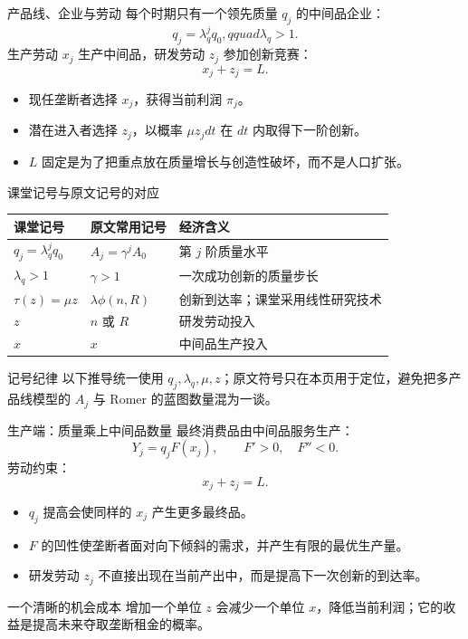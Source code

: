 \documentclass[aspectratio=32]{beamer}
\begin{document}
\begin{frame}{产品线、企业与劳动}
\small
每个时期只有一个领先质量 $q_j$ 的中间品企业：
\[
  q_j=\lambda_q^j q_0,qquad \lambda_q>1.
\]
生产劳动 $x_j$ 生产中间品，研发劳动 $z_j$ 参加创新竞赛：
\[
  \boxed{x_j+z_j=L}.
\]
\begin{itemize}
  \item 现任垄断者选择 $x_j$，获得当前利润 $\pi_j$。
  \item 潜在进入者选择 $z_j$，以概率 $\mu z_jdt$ 在 $dt$ 内取得下一阶创新。
  \item $L$ 固定是为了把重点放在质量增长与创造性破坏，而不是人口扩张。
\end{itemize}
\end{frame}

\begin{frame}{课堂记号与原文记号的对应}
\scriptsize
\begin{table}
\centering
\begin{tabular}{p{}p{}p{}}
\toprule
课堂记号 & 原文常用记号 & 经济含义 \\
\midrule
$q_j=\lambda_q^j q_0$ & $A_j=\gamma^jA_0$ & 第 $j$ 阶质量水平 \\
$\lambda_q>1$ & $\gamma>1$ & 一次成功创新的质量步长 \\
$\tau(z)=\mu z$ & $\lambda\phi(n,R)$ & 创新到达率；课堂采用线性研究技术 \\
$z$ & $n$ 或 $R$ & 研发劳动投入 \\
$x$ & $x$ & 中间品生产投入 \\
\bottomrule
\end{tabular}
\end{table}
\vspace{0.15cm}
\begin{alertblock}{记号纪律}
以下推导统一使用 $q_j,\lambda_q,\mu,z$；原文符号只在本页用于定位，避免把多产品线模型的 $A_j$ 与 Romer 的蓝图数量混为一谈。
\end{alertblock}
\end{frame}

\begin{frame}{生产端：质量乘上中间品数量}
\small
最终消费品由中间品服务生产：
\[
  \boxed{Y_j=q_jF(x_j)},\qquad F'>0,\quad F''<0.
\]
劳动约束：
\[
  x_j+z_j=L.
\]
\begin{itemize}
  \item $q_j$ 提高会使同样的 $x_j$ 产生更多最终品。
  \item $F$ 的凹性使垄断者面对向下倾斜的需求，并产生有限的最优生产量。
  \item 研发劳动 $z_j$ 不直接出现在当前产出中，而是提高下一次创新的到达率。
\end{itemize}
\begin{block}{一个清晰的机会成本}
增加一个单位 $z$ 会减少一个单位 $x$，降低当前利润；它的收益是提高未来夺取垄断租金的概率。
\end{block}
\end{frame}
\end{document}
